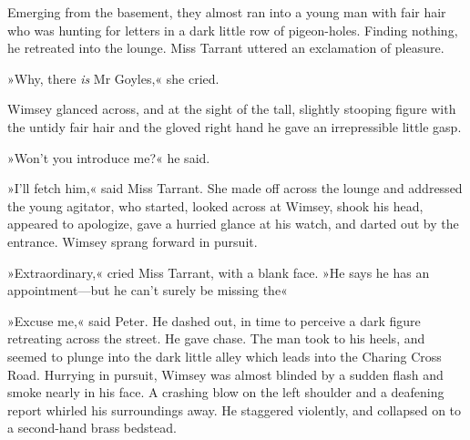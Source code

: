 Emerging from the basement, they almost ran into a young man with fair hair who was hunting for letters in a dark little row of pigeon-holes.  Finding nothing, he retreated into the lounge. Miss Tarrant uttered an exclamation of pleasure.

»Why, there \textit{is} Mr Goyles,« she cried.

Wimsey glanced across, and at the sight of the tall, slightly stooping figure with the untidy fair hair and the gloved right hand he gave an irrepressible little gasp.

»Won't you introduce me?« he said.

»I'll fetch him,« said Miss Tarrant. She made off across the lounge and addressed the young agitator, who started, looked across at Wimsey, shook his head, appeared to apologize, gave a hurried glance at his watch, and darted out by the entrance. Wimsey sprang forward in pursuit.

»Extraordinary,« cried Miss Tarrant, with a blank face. »He says he has an appointment—but he can't surely be missing the\longdash«

»Excuse me,« said Peter. He dashed out, in time to perceive a dark figure retreating across the street. He gave chase. The man took to his heels, and seemed to plunge into the dark little alley which leads into the Charing Cross Road. Hurrying in pursuit, Wimsey was almost blinded by a sudden flash and smoke nearly in his face. A crashing blow on the left shoulder and a deafening report whirled his surroundings away. He staggered violently, and collapsed on to a second-hand brass bedstead.
